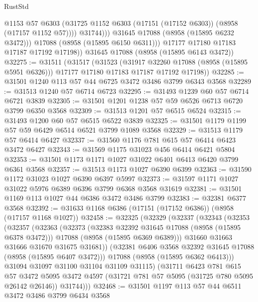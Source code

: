\begin{lexlean}{RustStd}
\begin{coremodule}
                    @1153
                    @57
                    @6303
                    (@31725 @1152 @6303 (@17151 (@17152 @6303)) (@8958 (@17157 @1152 @57))))
                  @31744)))
            @31645
            @17088
            (@8958 (@15895 @6232 @3472)))
          @17088
          (@8958 (@15895 @6150 @6311)))
        @17177
        @17180
        @17183
        @17187
        @17192
        @17198))
    @31645
    @17088
    (@8958 (@15895 @6143 @3472))
@32275 := @31511
    (@31517
      (@31523
        (@31917 @32260 @17088 (@8958 (@15895 @5951 @6326)))
        @17177
        @17180
        @17183
        @17187
        @17192
        @17198))
@32285 := @31501 @1240 @113 @57 @44 @6725 @3472 @3486 @3799 @6343 @3568
@32289 := @31513 @1240 @57 @6714 @6723
@32295 := @31493 @1239 @60 @57 @6714 @6721 @3839
@32305 := @31501 @1201 @1238 @57 @59 @6526 @6713 @6720 @3799 @6350 @3568
@32309 := @31513 @1201 @57 @6515 @6524
@32315 := @31493 @1200 @60 @57 @6515 @6522 @3839
@32325 := @31501 @1179 @1199 @57 @59 @6429 @6514 @6521 @3799 @1089 @3568
@32329 := @31513 @1179 @57 @6414 @6427
@32337 := @31560 @1176 @781 @615 @57 @6414 @6423 @3472 @6427
@32343 := @31569 @1175 @31023 @456 @6414 @6421 @5804
@32353 := @31501 @1173 @1171 @1027 @31022 @6401 @6413 @6420 @3799 @6361 @3568
@32357 := @31513 @1173 @1027 @6390 @6399
@32363 := @31590 @1172 @31023 @1027 @6390 @6397 @5997
@32373 := @31597 @1171 @1027 @31022 @5976 @6389 @6396 @3799 @6368 @3568 @31619
@32381 := @31501 @1169 @113 @1027 @44 @6386 @3472 @3486 @3799
@32383 := @32381 @6377 @3568
@32392 := @31633 @1168 @6386 (@17151 (@17152 @6386)) (@8958 (@17157 @1168 @1027))
@32458 := @32325
    (@32329
      (@32337
        (@32343
          (@32353
            (@32357
              (@32363
                (@32373
                  (@32383 @32392 @31645 @17088 (@8958 (@15895 @6378 @3472)))
                  @17088
                  (@8958 (@15895 @6369 @6389)))
                @31660
                @31663
                @31666
                @31670
                @31675
                @31681))
            (@32381 @6406 @3568 @32392 @31645 @17088 (@8958 (@15895 @6407 @3472)))
            @17088
            (@8958 (@15895 @6362 @6413)))
          @31094
          @31097
          @31100
          @31104
          @31109
          @31115)
        (@31711
          @6423
          @781
          @615
          @57
          @3472
          @5095
          @3472
          @4597
          (@31721 @781 @57 @5095 (@31725 @780 @5095 @26142 @26146))
          @31744)))
@32468 := @31501 @1197 @113 @57 @44 @6511 @3472 @3486 @3799 @6434 @3568

\end{coremodule}
\end{lexlean}
